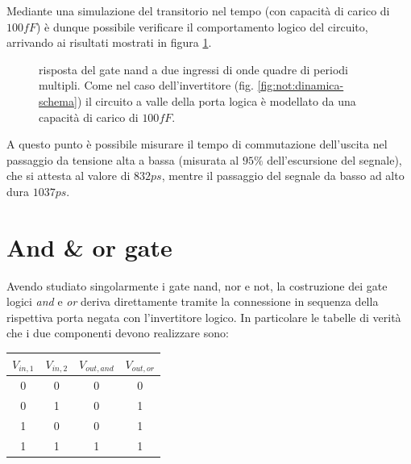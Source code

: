 	Mediante una simulazione del transitorio nel tempo (con capacità di carico di $100fF$) è dunque possibile verificare il comportamento logico del circuito, arrivando ai risultati mostrati in figura \ref{fig:nand:dinamica}.	

	\begin{figure}[bht]
		\centering
		
		\caption{risposta del gate nand a due ingressi di onde quadre di periodi multipli. Come nel caso dell'invertitore (fig. \ref{fig:not:dinamica-schema}) il circuito a valle della porta logica è modellato da una capacità di carico di $100fF$.}
		\label{fig:nand:dinamica}
	\end{figure}
	
	A questo punto è possibile misurare il tempo di commutazione dell'uscita nel passaggio da tensione alta a bassa (misurata al $95\%$ dell'escursione del segnale), che si attesta al valore di $832ps$, mentre il passaggio del segnale da basso ad alto dura $1037ps$.
	
\section{And \& or gate}
	Avendo studiato singolarmente i gate nand, nor e not, la costruzione dei gate logici \textit{and} e \textit{or} deriva direttamente tramite la connessione in sequenza della rispettiva porta negata con l'invertitore logico. In particolare le tabelle di verità che i due componenti devono realizzare sono:
	
	\begin{center}
		\begin{tabular}{c c | c | c}
			$V_{in,1}$ & $V_{in,2}$ & $V_{out,and}$ & $V_{out,or}$ \\ \hline
			0 & 0 & 0 & 0 \\
			0 & 1 & 0 & 1 \\
			1 & 0 & 0 & 1 \\
			1 & 1 & 1 & 1 \\
		\end{tabular}
	\end{center}

